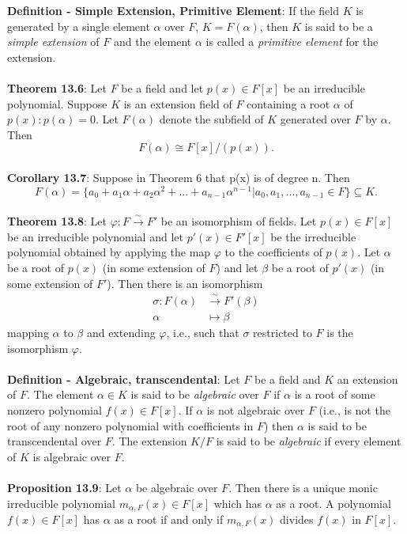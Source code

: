 \documentclass{article}
\begin{document}
\textbf{Definition - Simple Extension, Primitive Element}: If the field $K$ is generated by a single element $\alpha$ over $F$, $K = F(\alpha)$, then $K$ is said to be a \textit{simple extension} of $F$ and the element $\alpha$ is called a \textit{primitive element} for the extension. \\ \\
\textbf{Theorem 13.6}: Let $F$ be a field and let $p(x) \in F[x]$ be an irreducible polynomial. Suppose
$K$ is an extension field of $F$ containing a root $\alpha$ of $p(x): p(\alpha) = 0$. Let $F(\alpha)$ denote the subfield of $K$ generated over $F$ by $\alpha$. Then $$F(\alpha) \cong F[x]/(p(x)).$$ \\
\textbf{Corollary 13.7}: Suppose in Theorem 6 that p(x) is of degree n. Then $$F(\alpha) = \{a_0 + a_1\alpha + a_2\alpha^2 + \dots + a_{n - 1}\alpha^{n - 1} | a_0, a_1, \dots, a_{n - 1} \in F\} \subseteq K.$$ \\
\textbf{Theorem 13.8}: Let $\varphi : F \xrightarrow{\sim} F'$ be an isomorphism of fields. Let $p(x) \in F[x]$ be an irreducible polynomial and let $p'(x) \in F'[x]$ be the irreducible polynomial obtained by applying the map $\varphi$ to the coefficients of $p(x)$. Let $\alpha$ be a root of $p(x)$ (in some extension of $F$) and let $\beta$ be a root of $p'(x)$ (in some extension of $F'$). Then there is an isomorphism \begin{align*}
    \sigma: F(\alpha) &\xrightarrow{\sim} F'(\beta) \\ 
    \alpha &\mapsto \beta
\end{align*} mapping $\alpha$ to $\beta$ and extending $\varphi$, i.e., such that $\sigma$ restricted to $F$ is the isomorphism $\varphi$. \\ \\
\textbf{Definition - Algebraic, transcendental}: Let $F$ be a field and $K$ an extension of $F$. The element $\alpha \in K$ is said to be \textit{algebraic} over $F$ if $\alpha$ is a root of some nonzero polynomial $f(x) \in F[x]$. If $\alpha$ is not algebraic over $F$ (i.e., is not the root of any nonzero polynomial with coefficients in $F$) then $\alpha$ is said to be transcendental over $F$. The extension $K / F$ is said to be \textit{algebraic} if every element of $K$ is algebraic over $F$. \\ \\
\textbf{Proposition 13.9}: Let $\alpha$ be algebraic over $F$. Then there is a unique monic irreducible polynomial $m_{\alpha, F}(x) \in F[x]$ which has $\alpha$ as a root. A polynomial $f(x) \in F[x]$ has $\alpha$ as a root if and only if $m_{\alpha, F}(x)$ divides $f(x)$ in $F[x]$. \\ \\
\end{document}
